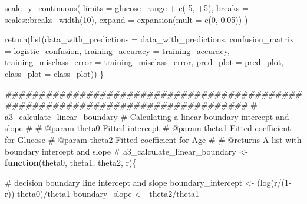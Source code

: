 \documentclass[
  english,
  11pt,
]{article}
\newenvironment{Shaded}{\begin{snugshade}}{\end{snugshade}}
\newcommand{\AttributeTok}[1]{\textcolor[rgb]{0.40,0.45,0.13}{#1}}
\newcommand{\CommentTok}[1]{\textcolor[rgb]{0.37,0.37,0.37}{#1}}
\newcommand{\ControlFlowTok}[1]{\textcolor[rgb]{0.00,0.23,0.31}{\textbf{#1}}}
\newcommand{\DecValTok}[1]{\textcolor[rgb]{0.68,0.00,0.00}{#1}}
\newcommand{\DocumentationTok}[1]{\textcolor[rgb]{0.37,0.37,0.37}{\textit{#1}}}
\newcommand{\FloatTok}[1]{\textcolor[rgb]{0.68,0.00,0.00}{#1}}
\newcommand{\FunctionTok}[1]{\textcolor[rgb]{0.28,0.35,0.67}{#1}}
\newcommand{\NormalTok}[1]{\textcolor[rgb]{0.00,0.23,0.31}{#1}}
\newcommand{\OtherTok}[1]{\textcolor[rgb]{0.00,0.23,0.31}{#1}}
\newcommand{\SpecialCharTok}[1]{\textcolor[rgb]{0.37,0.37,0.37}{#1}}
\begin{document}
\begin{Shaded}
\begin{Highlighting}[]
    \FunctionTok{scale\_y\_continuous}\NormalTok{(}
      \AttributeTok{limits =}\NormalTok{ glucose\_range }\SpecialCharTok{+} \FunctionTok{c}\NormalTok{(}\SpecialCharTok{{-}}\DecValTok{5}\NormalTok{, }\SpecialCharTok{+}\DecValTok{5}\NormalTok{),}
      \AttributeTok{breaks =}\NormalTok{ scales}\SpecialCharTok{::}\FunctionTok{breaks\_width}\NormalTok{(}\DecValTok{10}\NormalTok{),}
      \AttributeTok{expand =} \FunctionTok{expansion}\NormalTok{(}\AttributeTok{mult =} \FunctionTok{c}\NormalTok{(}\DecValTok{0}\NormalTok{, }\FloatTok{0.05}\NormalTok{))}
\NormalTok{    )}

  \FunctionTok{return}\NormalTok{(}\FunctionTok{list}\NormalTok{(}\AttributeTok{data\_with\_predictions =}\NormalTok{ data\_with\_predictions,}
              \AttributeTok{confusion\_matrix =}\NormalTok{ logistic\_confusion,}
              \AttributeTok{training\_accuracy =}\NormalTok{ training\_accuracy,}
              \AttributeTok{training\_misclass\_error =}\NormalTok{ training\_misclass\_error,}
              \AttributeTok{pred\_plot =}\NormalTok{ pred\_plot,}
              \AttributeTok{class\_plot =}\NormalTok{ class\_plot))}
\NormalTok{\}}

\DocumentationTok{\#\#\#\#\#\#\#\#\#\#\#\#\#\#\#\#\#\#\#\#\#\#\#\#\#\#\#\#\#\#\#\#\#\#\#\#\#\#\#\#\#\#\#\#\#\#\#\#\#\#\#\#\#\#\#\#\#\#\#\#\#\#\#\#\#\#\#\#\#\#\#\#\#\#\#\#\#\#\#\#}
\CommentTok{\#\textquotesingle{} a3\_calculate\_linear\_boundary}
\CommentTok{\#\textquotesingle{} Calculating a linear boundary intercept and slope}
\CommentTok{\#\textquotesingle{}}
\CommentTok{\#\textquotesingle{} @param theta0 Fitted intercept}
\CommentTok{\#\textquotesingle{} @param theta1 Fitted coefficient for Glucose}
\CommentTok{\#\textquotesingle{} @param theta2 Fitted coefficient for Age}
\CommentTok{\#\textquotesingle{}}
\CommentTok{\#\textquotesingle{} @returns A list with boundary intercept and slope}
\CommentTok{\#\textquotesingle{}}
\NormalTok{a3\_calculate\_linear\_boundary }\OtherTok{\textless{}{-}} \ControlFlowTok{function}\NormalTok{(theta0, theta1, theta2, r)\{}

  \CommentTok{\# decision boundary line intercept and slope}
\NormalTok{  boundary\_intercept }\OtherTok{\textless{}{-}}\NormalTok{  (}\FunctionTok{log}\NormalTok{(r}\SpecialCharTok{/}\NormalTok{(}\DecValTok{1}\SpecialCharTok{{-}}\NormalTok{r))}\SpecialCharTok{{-}}\NormalTok{theta0)}\SpecialCharTok{/}\NormalTok{theta1}
\NormalTok{  boundary\_slope }\OtherTok{\textless{}{-}}  \SpecialCharTok{{-}}\NormalTok{theta2}\SpecialCharTok{/}\NormalTok{theta1}


\end{Highlighting}
\end{Shaded}
\end{document}
